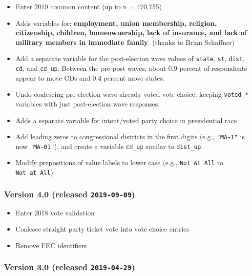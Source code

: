 \documentclass[10pt,article,oneside]{memoir}
\theoremstyle{definition}
\begin{document}
\begin{itemize}
\tightlist
\item
  Enter 2019 common content (up to n = 470,755)
\item
  Adds variables for: \textbf{employment, union membership, religion,
  citizenship, children, homeownership, lack of insurance, and lack of
  military members in immediate family}. (thanks to Brian Schaffner)
\item
  Add a separate variable for the post-election wave values of
  \texttt{state}, \texttt{st}, \texttt{dist}, \texttt{cd}, and
  \texttt{cd\_up}. Between the pre-post waves, about 0.9 percent of
  respondents appear to move CDs and 0.4 percent move states.
\item
  Undo coalescing pre-election wave already-voted vote choice, keeping
  \texttt{voted\_*} variables with just post-election wave responses.
\item
  Adds a separate variable for intent/voted party choice in presidential
  race
\item
  Add leading zeros to congressional districts in the first digits
  (e.g., \texttt{"MA-1"} is now \texttt{"MA-01"}), and create a variable
  \texttt{cd\_up} similar to \texttt{dist\_up}.
\item
  Modify prepositions of value labels to lower case (e.g.,
  \texttt{Not\ At\ All} to \texttt{Not\ at\ All})
\end{itemize}

\subsubsection{\texorpdfstring{Version 4.0 (released
\texttt{2019-09-09})}{Version 4.0 (released 2019-09-09)}}\label{version-4.0-released-2019-09-09}

\begin{itemize}
\tightlist
\item
  Enter 2018 vote validation
\item
  Coalesce straight party ticket vote into vote choice entries
\item
  Remove FEC identifiers
\end{itemize}

\subsubsection{\texorpdfstring{Version 3.0 (released
\texttt{2019-04-29})}{Version 3.0 (released 2019-04-29)}}\label{version-3.0-released-2019-04-29}
\end{document}
